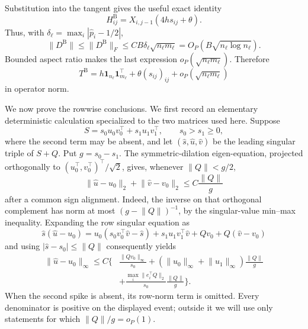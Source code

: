 Substitution into the tangent gives the useful exact identity
\[
 H^{\mathrm B}_{ij}=X_{i,j-1}(4hs_{ij}+\theta).
\]
Thus, with \(\delta_\ell=\max_i|\widehat p_i-1/2|\),
\[
 \lVert D^{\mathrm B}\rVert
 \le \lVert D^{\mathrm B}\rVert_F
 \le C B\delta_\ell\sqrt{n_\ell m_\ell}
 =O_P(B\sqrt{n_\ell\log n_\ell}).
\]
Bounded aspect ratio makes the last expression \(o_P(\sqrt{n_\ell m_\ell})\).  Therefore
\[
 T^{\mathrm B}
 =h\mathbf1_{n_\ell}\mathbf1_{m_\ell}^\top
 +\theta(s_{ij})_{ij}+o_P(\sqrt{n_\ell m_\ell})
\]
in operator norm.

We now prove the rowwise conclusions.  We first record an elementary deterministic calculation specialized to the two matrices used here.  Suppose
\[
 S=s_0u_0v_0^\top+s_1u_1v_1^\top,
 \qquad s_0>s_1\ge0,
\]
where the second term may be absent, and let \((\widehat s,\widehat u,\widehat v)\) be the leading singular triple of \(S+Q\).  Put \(g=s_0-s_1\).  The symmetric-dilation eigen-equation, projected orthogonally to \((u_0^\top,v_0^\top)^\top/\sqrt2\), gives, whenever \(\lVert Q\rVert<g/2\),
\[
 \lVert\widehat u-u_0\rVert_2+
 \lVert\widehat v-v_0\rVert_2
 \le C\frac{\lVert Q\rVert}{g}
\]
after a common sign alignment.  Indeed, the inverse on that orthogonal complement has norm at most \((g-\lVert Q\rVert)^{-1}\), by the singular-value min--max inequality.  Expanding the row singular equation as
\[
 \widehat s(\widehat u-u_0)
 =u_0(s_0v_0^\top\widehat v-\widehat s)
 +s_1u_1v_1^\top\widehat v+Qv_0+Q(\widehat v-v_0)
\]
and using \(|\widehat s-s_0|\le\lVert Q\rVert\) consequently yields
\[
 \begin{aligned}
 \lVert\widehat u-u_0\rVert_\infty
 \le C\bigg\{&\frac{\lVert Qv_0\rVert_\infty}{s_0}
 +(\lVert u_0\rVert_\infty+\lVert u_1\rVert_\infty)
   \frac{\lVert Q\rVert}{g}\\
 &+\frac{\max_i\lVert e_i^\top Q\rVert_2}{s_0}
   \frac{\lVert Q\rVert}{g}\bigg\}.
 \end{aligned}
\]
When the second spike is absent, its row-norm term is omitted.  Every denominator is positive on the displayed event; outside it we will use only statements for which \(\lVert Q\rVert/g=o_P(1)\).


